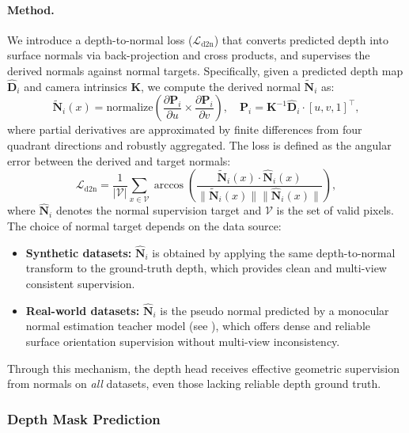 \documentclass{article} %
\begin{document}
\paragraph{Method.}
We introduce a depth-to-normal loss ($\mathcal{L}_{\text{d2n}}$) that converts predicted depth into surface normals via back-projection and cross products, and supervises the derived normals against normal targets. Specifically, given a predicted depth map $\hat{\mathbf{D}}_i$ and camera intrinsics $\mathbf{K}$, we compute the derived normal $\tilde{\mathbf{N}}_i$ as:
\begin{equation}
    \tilde{\mathbf{N}}_i(x) = \text{normalize}\left(\frac{\partial \mathbf{P}_i}{\partial u} \times \frac{\partial \mathbf{P}_i}{\partial v}\right), \quad \mathbf{P}_i = \mathbf{K}^{-1} \hat{\mathbf{D}}_i \cdot [u, v, 1]^\top,
\end{equation}
where partial derivatives are approximated by finite differences from four quadrant directions and robustly aggregated. The loss is defined as the angular error between the derived and target normals:
\begin{equation}
    \mathcal{L}_{\text{d2n}} = \frac{1}{|\mathcal{V}|} \sum_{x \in \mathcal{V}} \arccos\left(\frac{\tilde{\mathbf{N}}_i(x) \cdot \hat{\mathbf{N}}_i(x)}{\|\tilde{\mathbf{N}}_i(x)\| \|\hat{\mathbf{N}}_i(x)\|}\right),
\end{equation}
where $\hat{\mathbf{N}}_i$ denotes the normal supervision target and $\mathcal{V}$ is the set of valid pixels. The choice of normal target depends on the data source:
\begin{itemize}[nosep,leftmargin=1.5em]
    \item \textbf{Synthetic datasets:} $\hat{\mathbf{N}}_i$ is obtained by applying the same depth-to-normal transform to the ground-truth depth, which provides clean and multi-view consistent supervision.
    \item \textbf{Real-world datasets:} $\hat{\mathbf{N}}_i$ is the pseudo normal predicted by a monocular normal estimation teacher model (see ), which offers dense and reliable surface orientation supervision without multi-view inconsistency.
\end{itemize}
Through this mechanism, the depth head receives effective geometric supervision from normals on \emph{all} datasets, even those lacking reliable depth ground truth.

\subsubsection{Depth Mask Prediction}
\label{sec:depth_mask}
\end{document}
